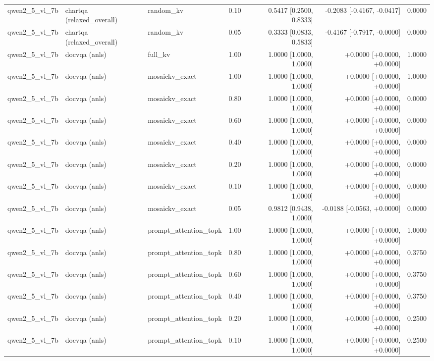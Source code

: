 \begin{longtable}{lllrrrr}
qwen2\_5\_vl\_7b & chartqa (relaxed\_overall) & random\_kv & 0.10 & 0.5417 [0.2500, 0.8333] & -0.2083 [-0.4167, -0.0417] & 0.0000 \\
qwen2\_5\_vl\_7b & chartqa (relaxed\_overall) & random\_kv & 0.05 & 0.3333 [0.0833, 0.5833] & -0.4167 [-0.7917, -0.0000] & 0.0000 \\
qwen2\_5\_vl\_7b & docvqa (anls) & full\_kv & 1.00 & 1.0000 [1.0000, 1.0000] & +0.0000 [+0.0000, +0.0000] & 1.0000 \\
qwen2\_5\_vl\_7b & docvqa (anls) & mosaickv\_exact & 1.00 & 1.0000 [1.0000, 1.0000] & +0.0000 [+0.0000, +0.0000] & 1.0000 \\
qwen2\_5\_vl\_7b & docvqa (anls) & mosaickv\_exact & 0.80 & 1.0000 [1.0000, 1.0000] & +0.0000 [+0.0000, +0.0000] & 0.0000 \\
qwen2\_5\_vl\_7b & docvqa (anls) & mosaickv\_exact & 0.60 & 1.0000 [1.0000, 1.0000] & +0.0000 [+0.0000, +0.0000] & 0.0000 \\
qwen2\_5\_vl\_7b & docvqa (anls) & mosaickv\_exact & 0.40 & 1.0000 [1.0000, 1.0000] & +0.0000 [+0.0000, +0.0000] & 0.0000 \\
qwen2\_5\_vl\_7b & docvqa (anls) & mosaickv\_exact & 0.20 & 1.0000 [1.0000, 1.0000] & +0.0000 [+0.0000, +0.0000] & 0.0000 \\
qwen2\_5\_vl\_7b & docvqa (anls) & mosaickv\_exact & 0.10 & 1.0000 [1.0000, 1.0000] & +0.0000 [+0.0000, +0.0000] & 0.0000 \\
qwen2\_5\_vl\_7b & docvqa (anls) & mosaickv\_exact & 0.05 & 0.9812 [0.9438, 1.0000] & -0.0188 [-0.0563, +0.0000] & 0.0000 \\
qwen2\_5\_vl\_7b & docvqa (anls) & prompt\_attention\_topk & 1.00 & 1.0000 [1.0000, 1.0000] & +0.0000 [+0.0000, +0.0000] & 1.0000 \\
qwen2\_5\_vl\_7b & docvqa (anls) & prompt\_attention\_topk & 0.80 & 1.0000 [1.0000, 1.0000] & +0.0000 [+0.0000, +0.0000] & 0.3750 \\
qwen2\_5\_vl\_7b & docvqa (anls) & prompt\_attention\_topk & 0.60 & 1.0000 [1.0000, 1.0000] & +0.0000 [+0.0000, +0.0000] & 0.3750 \\
qwen2\_5\_vl\_7b & docvqa (anls) & prompt\_attention\_topk & 0.40 & 1.0000 [1.0000, 1.0000] & +0.0000 [+0.0000, +0.0000] & 0.3750 \\
qwen2\_5\_vl\_7b & docvqa (anls) & prompt\_attention\_topk & 0.20 & 1.0000 [1.0000, 1.0000] & +0.0000 [+0.0000, +0.0000] & 0.2500 \\
qwen2\_5\_vl\_7b & docvqa (anls) & prompt\_attention\_topk & 0.10 & 1.0000 [1.0000, 1.0000] & +0.0000 [+0.0000, +0.0000] & 0.2500 \\

\end{longtable}

